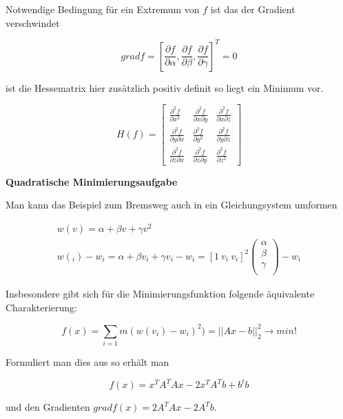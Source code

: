 \documentclass{report}
\begin{document}
Notwendige Bedingung für ein Extremum von $f$ ist das der Gradient verschwindet

\begin{equation}
    grad f = [\frac{\partial f}{\partial \alpha}, \frac{\partial f}{\partial \beta}, \frac{\partial f}{\partial \gamma}]^T = 0
\end{equation}

ist die Hessematrix hier zusätzlich positiv definit so liegt ein Minimum vor.

\[
H(f) =
\begin{bmatrix}
\frac{\partial^2 f}{\partial x^2} & \frac{\partial^2 f}{\partial x \partial y} & \frac{\partial^2 f}{\partial x \partial z} \\
\frac{\partial^2 f}{\partial y \partial x} & \frac{\partial^2 f}{\partial y^2} & \frac{\partial^2 f}{\partial y \partial z} \\
\frac{\partial^2 f}{\partial z \partial x} & \frac{\partial^2 f}{\partial z \partial y} & \frac{\partial^2 f}{\partial z^2}
\end{bmatrix}
\]

\textbf{Quadratische Minimierungsaufgabe}

Man kann das Beispiel zum Bremsweg auch in ein Gleichungsystem umformen

\begin{align}
    w(v) = \alpha + \beta v + \gamma v^2 \\
    w(_i)  - w_i = \alpha + \beta v_i + \gamma v_i - w_i = [1 ~ v_i ~ v_i]^2 \begin{pmatrix} \alpha \\ \beta \\ \gamma \\ \end{pmatrix}- w_i
\end{align}

Insbesondere gibt sich für die Minimierungsfunktion folgende äquivalente Charakterierung:

\begin{equation}
    f(x) = \sum_{i=1}{m}(w(v_i)- w_i)^2) = ||Ax - b||_2^2 \to min!
\end{equation}

Formuliert man dies aus so erhält man

\begin{equation}
    f(x) = x^T A^TAx - 2x^T A^T b + b^t b
\end{equation}

und den Gradienten $grad f(x) = 2A^TAx - 2A^Tb$.
\end{document}

